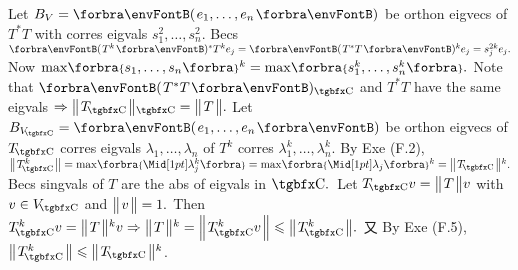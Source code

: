 Let $B_V=\Par{e_1,\dots,e_n}$ be orthon eigvecs of $T^*T$ with corres eigvals $s_1^2,\dots,s_n^2.$\parSol{}
Becs $\Par{T^k}{^*}T^ke_j=\Par{T^*T}{^k}e_j=s_j^{2k}e_j.$ \;Now $\max\!\Bra{s_1,\dots,s_n}{^k}=\max\!\Bra{s_1^k,\dots,s_n^k}.$\PfEnd\vspace{3pt}\parSol{}
\Or Note that $\Par{T^*T}{_\Cbb}$ and $T^*T$ have the same eigvals
$\Rightarrow\Dvert{T_{\!\Cbb}}{_\Cbb}=\Dvert{T}.$\parSol{}
Let $B_{V_{\!\Cbb}}=\Par{e_1,\dots,e_n}$ be orthon eigvecs of $T_{\!\Cbb}$ corres eigvals $\lambda_1,\dots,\lambda_n$ of $T^k$ corres $\lambda_1^k,\dots,\lambda_n^k.$\parSol{}
By Exe (F.2), $\Dvert{T_{\!\Cbb}^k}=\max\!\Bra{\aMid{\lambda_j^k}}=\max\!\Bra{\aMid{\lambda_j}}{^k}=\Dvert{T_{\!\Cbb}}{^k}.$\PfEnd\vspace{2pt}\parSol{}
\Or Becs singvals of $T$ are the abs of eigvals in $\Cbb.$ \,Let $T_{\!\Cbb}v=\Dvert{T}v$ with $v\in V_{\!\Cbb}$ and $\big\Vert\hspace{1pt}{}v{}\hspace{1pt}\big\Vert=1.$\parSol{}
Then $T_{\!\Cbb}^kv=\Dvert{T}{^k}v\Rightarrow\Dvert{T}{^k}=\BigDvert{T_{\!\Cbb}^kv}\leqslant\Dvert{T_{\!\Cbb}^k}.$ \;又 By Exe (F.5), $\Dvert{T_{\!\Cbb}^k}\leqslant\Dvert{T_{\!\Cbb}}{^k}$.\PfEnd
\SepLine





